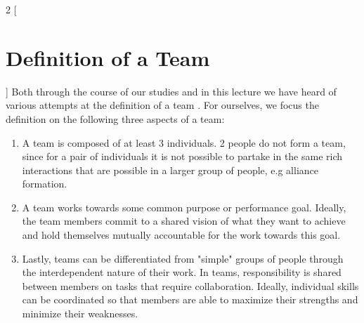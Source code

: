 \begin{multicols}{2}
[\section{Definition of a Team}]
Both through the course of our studies and in this lecture we have heard of various attempts at the definition of a team \cite{katzenbach2003the,BuildingBlocks}. 
For ourselves, we focus the definition on the following three aspects of a team:

  \begin{enumerate}[1.]
	\item A team is composed of at least 3 individuals. 2 people do not form a team, since for a pair of individuals it is not possible to partake in the same rich interactions that are possible in a larger group of people, e.g alliance formation.
	\item A team works towards some common purpose or performance goal. Ideally, the team members commit to a shared vision of what they want to achieve and hold themselves mutually accountable for the work towards this goal.
	\item Lastly, teams can be differentiated from "simple" groups of people through the interdependent nature of their work. In teams, responsibility is shared between members on tasks that require collaboration. Ideally, individual skills can be coordinated so that members are able to maximize their strengths and minimize their weaknesses.
  \end{enumerate}
\end{multicols}